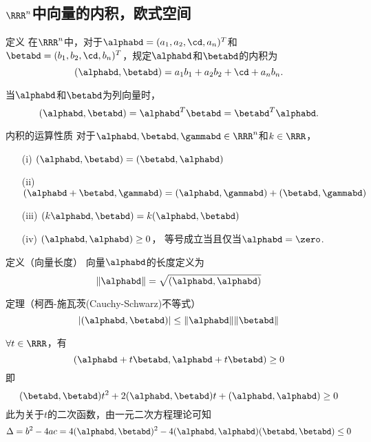\subsection{$\RRR^n$中向量的内积，欧式空间}
\begin{frame}
  \begin{footnotesize}
    \begin{block}{定义}
      在$\RRR^n$中，对于$\alphabd=(a_1,a_2,\cd,a_n)^T$和$\betabd=(b_1,b_2,\cd,b_n)^T$，规定$\alphabd$和$\betabd$的内积为
      $$
      (\alphabd,\betabd)=a_1b_1+a_2b_2+\cd+a_nb_n.
      $$
    \end{block}
    当$\alphabd$和$\betabd$为列向量时，
    $$
    (\alphabd,\betabd)=\alphabd^T\betabd=\betabd^T\alphabd.
    $$
  \end{footnotesize}
\end{frame}

\begin{frame}
  \begin{footnotesize}
    \begin{block}{内积的运算性质}
      对于$\alphabd,\betabd,\gammabd\in\RRR^n$和$k\in\RRR$，
      \begin{itemize}
      \item[(i)]   $(\alphabd,\betabd)=(\betabd,\alphabd)$
      \item[(ii)]  $(\alphabd+\betabd,\gammabd)=(\alphabd,\gammabd)+(\betabd,\gammabd)$
      \item[(iii)] $(k\alphabd,\betabd)=k(\alphabd,\betabd)$
      \item[(iv)]  $(\alphabd,\alphabd)\ge0$， 等号成立当且仅当$\alphabd=\zero$.
      \end{itemize}
    \end{block}
    \pause
    \begin{block}{定义（向量长度）}
      向量$\alphabd$的长度定义为
      $$
      \|\alphabd\|=\sqrt{(\alphabd,\alphabd)}
      $$
    \end{block}
  \end{footnotesize}
\end{frame}


\begin{frame}
  \begin{footnotesize}
    \begin{block}{定理（柯西-施瓦茨(Cauchy-Schwarz)不等式）}
      $$
      |(\alphabd,\betabd)|\le\|\alphabd\|\|\betabd\|
      $$
    \end{block}
    \pause 
    \proofname
    $\forall t \in \RRR$，有
    $$
    (\alphabd+t\betabd,\alphabd+t\betabd) \ge 0
    $$
    即
    $$
    (\betabd,\betabd)t^2+2(\alphabd,\betabd)t+(\alphabd,\alphabd)\ge0
    $$
    此为关于$t$的二次函数，由一元二次方程理论可知
    $$
    \Delta = b^2-4ac = 4 (\alphabd,\betabd)^2-4(\alphabd,\alphabd)(\betabd,\betabd)\le 0
    $$
  \end{footnotesize}
\end{frame}


